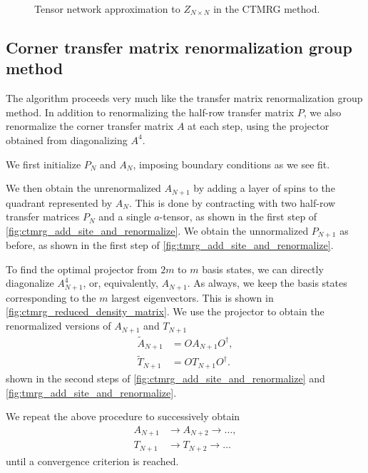 \begin{figure}
  
  \caption{Tensor network approximation to $Z_{N \times N}$ in the CTMRG method.}
  \label{fig:partition_function_tensor_network}
\end{figure}

\subsection{Corner transfer matrix renormalization group method}
The algorithm proceeds very much like the transfer matrix renormalization group method. In addition to renormalizing the half-row transfer matrix $P$, we also renormalize the
corner transfer matrix $A$ at each step, using the projector obtained from diagonalizing
$A^4$.


We first initialize $P_N$ and $A_N$, imposing boundary conditions as we see fit.

We then obtain the unrenormalized $A_{N+1}$ by adding a layer of spins to the quadrant
represented by $A_N$. This is done by contracting with two half-row transfer matrices
$P_N$ and a single $a$-tensor, as shown in the first step of
\autoref{fig:ctmrg_add_site_and_renormalize}. We obtain the unnormalized $P_{N+1}$ as
before, as shown in the first step of \autoref{fig:tmrg_add_site_and_renormalize}.

To find the optimal projector from $2m$ to $m$ basis states, we can directly diagonalize
$A_{N + 1}^4$, or, equivalently, $A_{N + 1}$. As always, we keep the basis states
corresponding to the $m$ largest eigenvectors. This is shown in
\autoref{fig:ctmrg_reduced_density_matrix}. We use the projector to obtain the
renormalized versions of $A_{N + 1}$ and $T_{N + 1}$
\begin{align}
    \widetilde{A}_{N + 1} &= OA_{N + 1}O^{\dagger}, \\
    \widetilde{T}_{N + 1} &= OT_{N + 1}O^{\dagger}.
\end{align}
shown in the second steps of \autoref{fig:ctmrg_add_site_and_renormalize} and
\autoref{fig:tmrg_add_site_and_renormalize}.

We repeat the above procedure to successively obtain
\begin{align}
  A_{N + 1} & \rightarrow A_{N + 2} \rightarrow \dots, \\
  T_{N + 1} & \rightarrow T_{N + 2} \rightarrow \dots
\end{align}
until a convergence criterion is reached.


